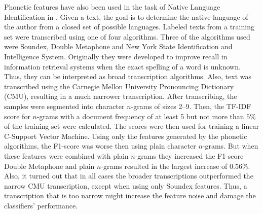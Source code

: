 Phonetic features have also been used in the task of Native Language Identification in \cite{smiley2017native}.
Given a text, the goal is to determine the native language of the author from a closed set of possible languages.
Labeled texts from a training set were transcribed using one of four algorithms.
Three of the algorithms used were Soundex, Double Metaphone and New York State Identification and Intelligence System.
Originally they were developed to improve recall in information retrieval systems when the exact spelling of a word is unknown.
Thus, they can be interpreted as broad transcription algorithms.
Also, text was transcribed using the Carnegie Mellon University Pronouncing Dictionary (CMU), resulting in a much narrower transcription.
After transcribing, the samples were segmented into character $n$-grams of sizes 2--9.
Then, the TF-IDF score for $n$-grams with a document frequency of at least 5 but not more than $5\%$ of the training set were calculated.
The scores were then used for training a linear C-Support Vector Machine.
Using only the features generated by the phonetic algorithms, the F1-score was worse then using plain character $n$-grams.
But when these features were combined with plain $n$-grams they increased the F1-score
Double Metaphone and plain $n$-grams resulted in the largest increase of $0.56\%$.
Also, it turned out that in all cases the broader transcriptions outperformed the narrow CMU transcription, except when using only Soundex features.
Thus, a transcription that is too narrow might increase the feature noise and damage the classifiers' performance.


